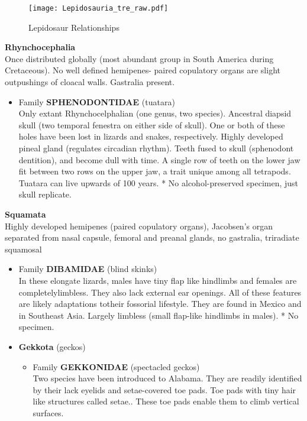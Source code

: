 \documentclass[a4paper,12pt]{article}
\begin{document}
\begin{figure}[H]
\centering
  \texttt{[image: Lepidosauria\_tre\_raw.pdf]}
  \caption{Lepidosaur Relationships}
  \label{fig:Lepidosauria}
\end{figure}

\begin{description}
\item\textbf{Rhynchocephalia} \\ Once distributed globally (most abundant group in South America during Cretaceous). No well defined hemipenes- paired copulatory organs are slight outpushings of cloacal walls. Gastralia present.
\begin{itemize}
  \item Family {\textbf{SPHENODONTIDAE} (tuatara)} \\ Only extant Rhynchocelphalian (one genus, two species). Ancestral diapsid skull (two temporal fenestra on either side of skull). One or both of these holes have been lost in lizards and snakes, respectively. Highly developed pineal gland (regulates circadian rhythm). Teeth fused to skull (sphenodont dentition), and become dull with time. A single row of teeth on the lower jaw fit between two rows on the upper jaw, a trait unique among all tetrapods. Tuatara can live upwards of 100 years. * No alcohol-preserved specimen, just skull replicate.
\end{itemize}
\item\textbf{Squamata} \\ Highly developed hemipenes (paired copulatory organs), Jacobsen's organ separated from nasal capsule, femoral and preanal glands, no gastralia, triradiate squamosal
\begin{itemize}
  \item Family {\textbf{DIBAMIDAE} (blind skinks)} \\ In these elongate lizards, males have tiny flap like hindlimbs and females are completelylimbless. They also lack external ear openings. All of these features are likely adaptations totheir fossorial lifestyle. They are found in Mexico and in Southeast Asia. Largely limbless (small flap-like hindlimbs in males). * No specimen.
  \item{\textbf{Gekkota} (geckos)}
  \begin{itemize}
    \item Family {\textbf{GEKKONIDAE} (spectacled geckos)} \\ Two species have been introduced to Alabama. They are readily identified by their lack eyelids and setae-covered toe pads. Toe pads with tiny hair like structures called setae.. These toe pads enable them to climb vertical surfaces.

\end{itemize}
\end{itemize}
\end{description}
\end{document}
